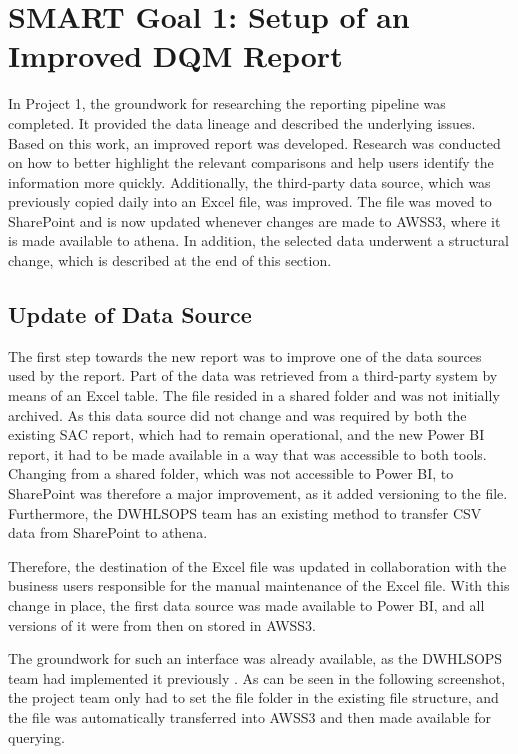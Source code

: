 \section{SMART Goal 1: Setup of an Improved DQM Report}

In Project 1, the groundwork for researching the reporting pipeline was completed. It provided the data lineage and described the underlying issues. Based on this work, an improved report was developed. Research was conducted on how to better highlight the relevant comparisons and help users identify the information more quickly. Additionally, the third-party data source, which was previously copied daily into an Excel file, was improved. The file was moved to SharePoint and is now updated whenever changes are made to \gls{AWSS3}, where it is made available to \gls{athena}. In addition, the selected data underwent a structural change, which is described at the end of this section.



\subsection*{Update of Data Source}

The first step towards the new report was to improve one of the data sources used by the report. Part of the data was retrieved from a third-party system by means of an Excel table. The file resided in a shared folder and was not initially archived. As this data source did not change and was required by both the existing SAC report, which had to remain operational, and the new Power BI report, it had to be made available in a way that was accessible to both tools. Changing from a shared folder, which was not accessible to Power BI, to SharePoint was therefore a major improvement, as it added versioning to the file. Furthermore, the \gls{DWHLSOPS} team has an existing method to transfer CSV data from SharePoint to \gls{athena}.

Therefore, the destination of the Excel file was updated in collaboration with the business users responsible for the manual maintenance of the Excel file. With this change in place, the first data source was made available to Power BI, and all versions of it were from then on stored in \gls{AWSS3}.

The groundwork for such an interface was already available, as the \gls{DWHLSOPS} team had implemented it previously \cite{Bosek2026_SharePointS3}. As can be seen in the following screenshot, the project team only had to set the file folder in the existing file structure, and the file was automatically transferred into \gls{AWSS3} and then made available for querying.


